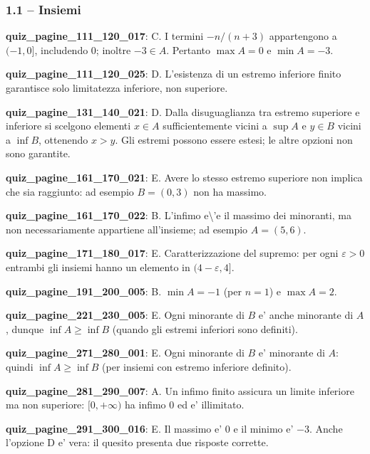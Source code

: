 \documentclass[11pt,a4paper]{article}
\newcounter{quiz}
\begin{document}
\subsubsection*{1.1 -- Insiemi}
\noindent\textbf{quiz\_pagine\_111\_120\_017}: C. I termini $-n/(n+3)$ appartengono a $(-1,0]$, includendo $0$; inoltre $-3\in A$. Pertanto $\max A=0$ e $\min A=-3$.\par\medskip
\noindent\textbf{quiz\_pagine\_111\_120\_025}: D. L'esistenza di un estremo inferiore finito garantisce solo limitatezza inferiore, non superiore.\par\medskip
\noindent\textbf{quiz\_pagine\_131\_140\_021}: D. Dalla disuguaglianza tra estremo superiore e inferiore si scelgono elementi $x\in A$ sufficientemente vicini a $\sup A$ e $y\in B$ vicini a $\inf B$, ottenendo $x>y$. Gli estremi possono essere estesi; le altre opzioni non sono garantite.\par\medskip
\noindent\textbf{quiz\_pagine\_161\_170\_021}: E. Avere lo stesso estremo superiore non implica che sia raggiunto: ad esempio $B=(0,3)$ non ha massimo.\par\medskip
\noindent\textbf{quiz\_pagine\_161\_170\_022}: B. L'infimo e\textbackslash{}'e il massimo dei minoranti, ma non necessariamente appartiene all'insieme; ad esempio $A=(5,6)$.\par\medskip
\noindent\textbf{quiz\_pagine\_171\_180\_017}: E. Caratterizzazione del supremo: per ogni $\varepsilon>0$ entrambi gli insiemi hanno un elemento in $(4-\varepsilon,4]$.\par\medskip
\noindent\textbf{quiz\_pagine\_191\_200\_005}: B. $\min A=-1$ (per $n=1$) e $\max A=2$.\par\medskip
\noindent\textbf{quiz\_pagine\_221\_230\_005}: E. Ogni minorante di $B$ e' anche minorante di $A$, dunque $\inf A\geq\inf B$ (quando gli estremi inferiori sono definiti).\par\medskip
\noindent\textbf{quiz\_pagine\_271\_280\_001}: E. Ogni minorante di $B$ e' minorante di $A$: quindi $\inf A\geq\inf B$ (per insiemi con estremo inferiore definito).\par\medskip
\noindent\textbf{quiz\_pagine\_281\_290\_007}: A. Un infimo finito assicura un limite inferiore ma non superiore: $[0,+\infty)$ ha infimo $0$ ed e' illimitato.\par\medskip
\noindent\textbf{quiz\_pagine\_291\_300\_016}: E. Il massimo e' $0$ e il minimo e' $-3$. Anche l'opzione D e' vera: il quesito presenta due risposte corrette.\par\medskip
\end{document}
